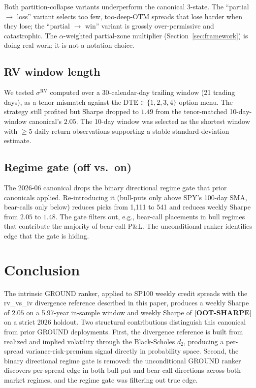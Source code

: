 \documentclass[11pt]{article}
\theoremstyle{definition}
\theoremstyle{remark}
\begin{document}
Both partition-collapse variants underperform the canonical 3-state.
The ``partial $\to$ loss'' variant selects too few, too-deep-OTM
spreads that lose harder when they lose; the ``partial $\to$ win''
variant is grossly over-permissive and catastrophic. The
$\alpha$-weighted partial-zone multiplier (Section~\ref{sec:framework})
is doing real work; it is not a notation choice.

\subsection{RV window length}
\label{sec:sensitivity-rv-window}

We tested $\sigma^{\mathrm{RV}}$ computed over a 30-calendar-day
trailing window (21 trading days), as a tenor mismatch against the
$\mathrm{DTE} \in \{1, 2, 3, 4\}$ option menu. The strategy still
profited but Sharpe dropped to $1.49$ from the tenor-matched
10-day-window canonical's $2.05$. The 10-day window was selected as
the shortest window with $\geq 5$ daily-return observations supporting
a stable standard-deviation estimate.

\subsection{Regime gate (off vs.\ on)}

The 2026-06 canonical drops the binary directional regime gate that
prior canonicals applied. Re-introducing it (bull-puts only above
SPY's 100-day SMA, bear-calls only below) reduces picks from 1{,}111
to 541 and reduces weekly Sharpe from $2.05$ to $1.48$. The gate
filters out, e.g., bear-call placements in bull regimes that
contribute the majority of bear-call P\&L. The unconditional ranker
identifies edge that the gate is hiding.


\section{Conclusion}
\label{sec:conclusion}

The intrinsic GROUND ranker, applied to SP100 weekly credit spreads
with the rv\_vs\_iv divergence reference described in this paper,
produces a weekly Sharpe of $2.05$ on a 5.97-year in-sample window
and weekly Sharpe of \textbf{[OOT-SHARPE]} on a strict 2026 holdout.
Two structural contributions distinguish this canonical from prior
GROUND deployments. First, the divergence reference is built from
realized and implied volatility through the Black-Scholes $d_2$,
producing a per-spread variance-risk-premium signal directly in
probability space. Second, the binary directional regime gate is
removed: the unconditional GROUND ranker discovers per-spread edge
in both bull-put and bear-call directions across both market regimes,
and the regime gate was filtering out true edge.
\end{document}
